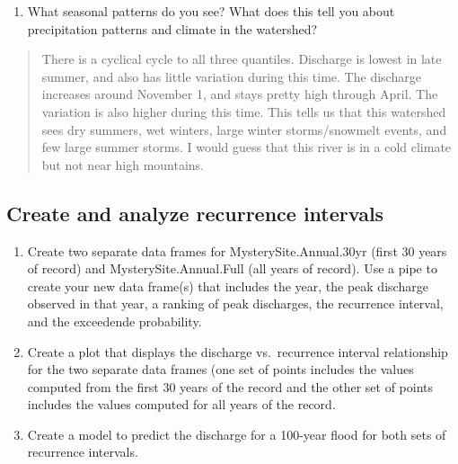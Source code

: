 \documentclass[]{article}
\providecommand{\tightlist}{%
  \setlength{\itemsep}{0pt}\setlength{\parskip}{0pt}}
\begin{document}
\begin{enumerate}
\def\labelenumi{\arabic{enumi}.}
\setcounter{enumi}{7}
\tightlist
\item
  What seasonal patterns do you see? What does this tell you about
  precipitation patterns and climate in the watershed?
\end{enumerate}

\begin{quote}
There is a cyclical cycle to all three quantiles. Discharge is lowest in
late summer, and also has little variation during this time. The
discharge increases around November 1, and stays pretty high through
April. The variation is also higher during this time. This tells us that
this watershed sees dry summers, wet winters, large winter
storms/snowmelt events, and few large summer storms. I would guess that
this river is in a cold climate but not near high mountains.
\end{quote}

\hypertarget{create-and-analyze-recurrence-intervals}{%
\subsection{Create and analyze recurrence
intervals}\label{create-and-analyze-recurrence-intervals}}

\begin{enumerate}
\def\labelenumi{\arabic{enumi}.}
\setcounter{enumi}{8}
\item
  Create two separate data frames for MysterySite.Annual.30yr (first 30
  years of record) and MysterySite.Annual.Full (all years of record).
  Use a pipe to create your new data frame(s) that includes the year,
  the peak discharge observed in that year, a ranking of peak
  discharges, the recurrence interval, and the exceedende probability.
\item
  Create a plot that displays the discharge vs.~recurrence interval
  relationship for the two separate data frames (one set of points
  includes the values computed from the first 30 years of the record and
  the other set of points includes the values computed for all years of
  the record.
\item
  Create a model to predict the discharge for a 100-year flood for both
  sets of recurrence intervals.
\end{enumerate}
\end{document}
